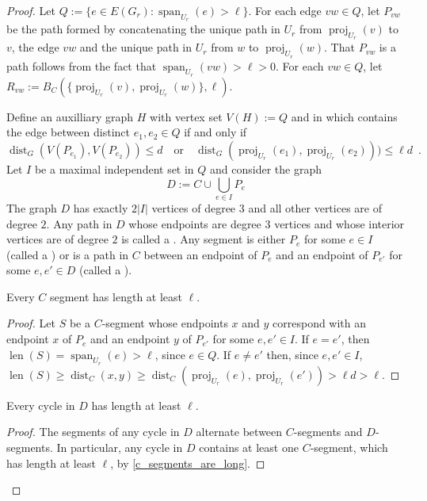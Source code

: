 \documentclass{patmorin}
\DeclareMathOperator{\len}{len}
\DeclareMathOperator{\proj}{proj}
\DeclareMathOperator{\spn}{span}
\DeclareMathOperator{\dist}{dist}
\begin{document}
\begin{proof}
  Let $Q:=\{e\in E(G_r):\spn_{U_r}(e)>\ell\}$.  For each edge $vw\in Q$, let $P_{vw}$ be the path formed by concatenating the unique path in $U_r$ from $\proj_{U_r}(v)$ to $v$, the edge $vw$ and the unique path in $U_r$ from $w$ to $\proj_{U_r}(w)$.  That $P_{vw}$ is a path follows from the fact that $\spn_{U_r}(vw)>\ell>0$.  For each $vw\in Q$, let $R_{vw}:=B_C(\{\proj_{U_r}(v),\proj_{U_r}(w)\}, \ell)$.

  Define an auxilliary graph $H$ with vertex set $V(H):=Q$ and in which contains the edge between distinct $e_1,e_2\in Q$ if and only if
  \[
    \dist_G(V(P_{e_1}),V(P_{e_2}))\le d\quad\text{or}\quad
    \dist_G(\proj_{U_r}(e_1),\proj_{U_r}(e_2)))\le \ell d \enspace .
  \]
  Let $I$ be a maximal independent set in $Q$ and consider the graph
  \[
    D:=C\cup \bigcup_{e\in I} P_e
  \]
  The graph $D$ has exactly $2|I|$ vertices of degree $3$ and all other vertices are of degree $2$.  Any path in $D$ whose endpoints are degree $3$ vertices and whose interior vertices are of degree $2$ is called a .  Any segment is either $P_e$ for some $e\in I$ (called a ) or is a path in $C$ between an endpoint of $P_e$ and an endpoint of $P_{e'}$ for some $e,e'\in D$ (called a ).

  \begin{clm}\label{c_segments_are_long}
    Every $C$ segment has length at least $\ell$.
  \end{clm}

  \begin{proof}
    Let $S$ be a $C$-segment whose endpoints $x$ and $y$ correspond with an endpoint $x$ of $P_e$ and an endpoint $y$ of $P_{e'}$ for some $e,e'\in I$. If $e=e'$, then $\len(S)=\spn_{U_r}(e)>\ell$, since $e\in Q$.  If $e\neq e'$ then, since $e,e'\in I$, $\len(S)\ge\dist_C(x,y)\ge \dist_C(\proj_{U_r}(e),\proj_{U_r}(e'))>\ell d>\ell$.
  \end{proof}

  \begin{clm}\label{cycles_are_long}
    Every cycle in $D$ has length at least $\ell$.
  \end{clm}
  \begin{proof}
    The segments of any cycle in $D$ alternate between $C$-segments and $D$-segments. In particular, any cycle in $D$ contains at least one $C$-segment, which has length at least $\ell$, by \cref{c_segments_are_long}.
  \end{proof}


\end{proof}
\end{document}
